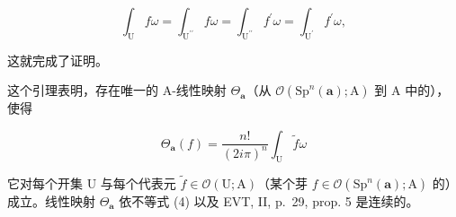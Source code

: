 \[
\int_ {\mathrm{U}} f \omega = \int_ {\mathrm {U^ {\prime\prime}}} f \omega = \int_ {\mathrm {U^ {\prime\prime}}} f ^ {\prime} \omega = \int_ {\mathrm {U^ {\prime}}} f ^ {\prime} \omega ,
\]

这就完成了证明。

这个引理表明，存在唯一的 A-线性映射 \(\Theta_{\boldsymbol{a}}\)（从 \(\mathcal{O}(\mathrm{Sp}^{n}(\boldsymbol{a});\mathrm{A})\) 到 A 中的），使得

\[
\Theta_ {\boldsymbol {a}} (f) = \frac {n !}{(2 i \pi) ^ {n}} \int_ {\mathrm{U}} \widetilde {f} \omega\tag{5}
\]

它对每个开集 U 与每个代表元 \(\tilde{f} \in \mathcal{O}(\mathrm{U};\mathrm{A})\)（某个芽 \(f \in \mathcal{O}(\mathrm{Sp}^n (\boldsymbol {a});\mathrm{A})\) 的）成立。线性映射 \(\Theta_{\boldsymbol{a}}\) 依不等式 (4) 以及 EVT, II, p.~29, prop. 5 是连续的。
